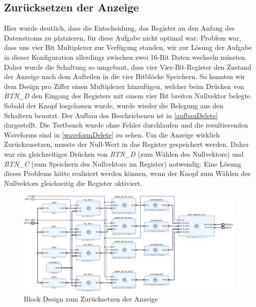 \documentclass[11pt, a4paper]{article}
\begin{document}
\subsection*{Zurücksetzen der Anzeige}
Hier wurde deutlich, dass die Entscheidung, das Register an den Anfang des Datenstroms zu platzieren, für diese Aufgabe nicht optimal war. Problem war, dass uns vier Bit Multiplexer zur Verfügung standen, wir zur Lösung der Aufgabe in dieser Konfiguration allerdings zwischen zwei 16-Bit Daten wechseln müssten. Daher wurde die Schaltung so umgebaut, dass vier Vier-Bit-Register den Zustand der Anzeige nach dem Aufteilen in die vier Bitblöcke Speichern. So konnten wir dem Design pro Ziffer einen Multiplexer hinzufügen, welcher beim Drücken von \textit{BTN\_D} den Eingang des Registers mit einem vier Bit breiten Nullvektor belegte. Sobald der Knopf losgelassen wurde, wurde wieder die Belegung aus den Schaltern benutzt. 
Der Aufbau des Beschriebenen ist in \autoref{aufbauDelete} dargestellt. Die Testbench wurde ohne Fehler durchlaufen und die resultierenden Waveforms sind in \autoref{waveformDelete} zu sehen.
Um die Anzeige wirklich Zurückzusetzen, musste der Null-Wert in das Register gespeichert werden. Daher war ein gleichzeitiges Drücken von \textit{BTN\_D} (zum Wählen des Nullvektors) und \textit{BTN\_C} (zum Speichern des Nullvektors im Register) notwendig. Eine Lösung dieses Problems hätte realisiert werden können, wenn der Knopf zum Wählen des Nullvektors gleichzeitig die Register aktiviert. 
\begin{figure}[H]    
    \centering
    \includegraphics[width=\linewidth]{versuch5Data/hierarchical_display_delete.pdf}
    \caption{Block Design zum Zurücksetzen der Anzeige}
    \label{aufbauDelete}        
\end{figure}
\end{document}
